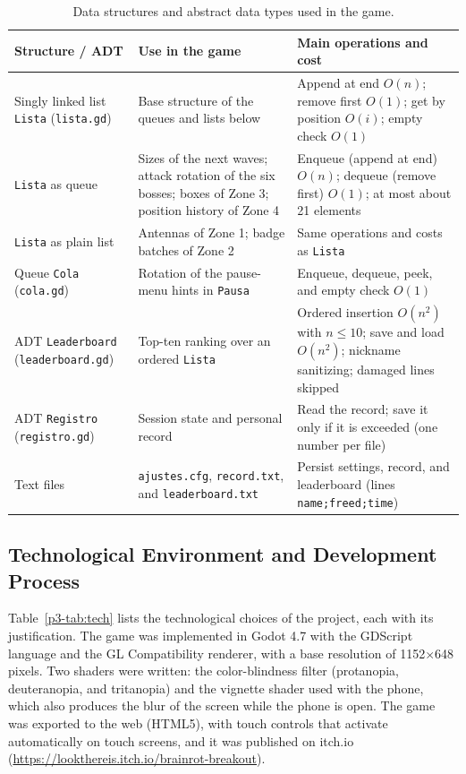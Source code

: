 \documentclass[conference]{IEEEtran}
\begin{document}
\begin{table}[t]
\caption{Data structures and abstract data types used in the game.}
\label{p3-tab:ds}
\centering
\small
\begin{tabularx}{\textwidth}{@{}p{4.2cm}p{5.8cm}X@{}}
\toprule
\textbf{Structure / ADT} & \textbf{Use in the game} & \textbf{Main operations and cost} \\
\midrule
Singly linked list \texttt{Lista} (\texttt{lista.gd}) & Base structure of the queues and lists below & Append at end $O(n)$; remove first $O(1)$; get by position $O(i)$; empty check $O(1)$ \\
\texttt{Lista} as queue & Sizes of the next waves; attack rotation of the six bosses; boxes of Zone 3; position history of Zone 4 & Enqueue (append at end) $O(n)$; dequeue (remove first) $O(1)$; at most about 21 elements \\
\texttt{Lista} as plain list & Antennas of Zone 1; badge batches of Zone 2 & Same operations and costs as \texttt{Lista} \\
Queue \texttt{Cola} (\texttt{cola.gd}) & Rotation of the pause-menu hints in \texttt{Pausa} & Enqueue, dequeue, peek, and empty check $O(1)$ \\
ADT \texttt{Leaderboard} (\texttt{leaderboard.gd}) & Top-ten ranking over an ordered \texttt{Lista} & Ordered insertion $O(n^2)$ with $n \le 10$; save and load $O(n^2)$; nickname sanitizing; damaged lines skipped \\
ADT \texttt{Registro} (\texttt{registro.gd}) & Session state and personal record & Read the record; save it only if it is exceeded (one number per file) \\
Text files & \texttt{ajustes.cfg}, \texttt{record.txt}, and \texttt{leaderboard.txt} & Persist settings, record, and leaderboard (lines \texttt{name;freed;time}) \\
\bottomrule
\end{tabularx}
\end{table}

\subsection{Technological Environment and Development Process}
\label{p3-sec:env}

Table~\ref{p3-tab:tech} lists the technological choices of the project, each with its justification. The game was implemented in Godot 4.7 with the GDScript language and the GL Compatibility renderer, with a base resolution of 1152$\times$648 pixels. Two shaders were written: the color-blindness filter (protanopia, deuteranopia, and tritanopia) and the vignette shader used with the phone, which also produces the blur of the screen while the phone is open. The game was exported to the web (HTML5), with touch controls that activate automatically on touch screens, and it was published on itch.io (\url{https://lookthereis.itch.io/brainrot-breakout}).
\end{document}
